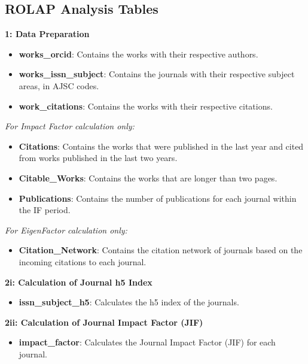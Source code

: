 \subsection{ROLAP Analysis Tables}

\noindent\textbf{1: Data Preparation}
\begin{itemize}
      \item \textbf{works\_orcid}: Contains the works with their respective authors.
      \item \textbf{works\_issn\_subject}: Contains the journals with their respective subject areas, in AJSC codes.
      \item \textbf{work\_citations}: Contains the works with their respective citations.
\end{itemize}

\vspace{0.5em} %
\noindent\emph{For Impact Factor calculation only:}
\begin{itemize}
      \item \textbf{Citations}: Contains the works that were published in the last year and cited from works published in the last two years.
      \item \textbf{Citable\_Works}: Contains the works that are longer than two pages.
      \item \textbf{Publications}: Contains the number of publications for each journal within the IF period.
\end{itemize}

\vspace{0.5em} %
\noindent\emph{For EigenFactor calculation only:}
\begin{itemize}
      \item \textbf{Citation\_Network}: Contains the citation network of journals based on the incoming citations to each journal.
\end{itemize}

\noindent\textbf{2i: Calculation of Journal h5 Index}
\begin{itemize}
      \item \textbf{issn\_subject\_h5}: Calculates the h5 index of the journals.
\end{itemize}

\noindent\textbf{2ii: Calculation of Journal Impact Factor (JIF)}
\begin{itemize}
      \item \textbf{impact\_factor}: Calculates the Journal Impact Factor (JIF) for each journal.
\end{itemize}

